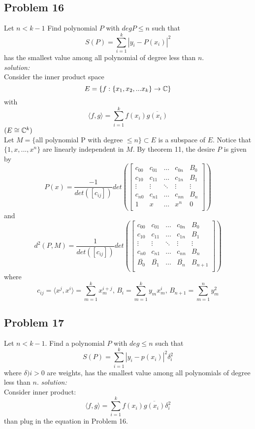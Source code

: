 \documentclass{article}
\begin{document}
\subsection*{Problem 16}
Let $n<k-1$ Find polynomial $P$ with $deg P\leq n$ such that 
\[
S(P)=\sum_{i=1}^{k}|y_i-P(x_i)|^2
\]
has the smallest value among all polynomial of degree less than $n$.\\
\emph{solution:}\\
Consider the inner product space
\[
E = \{f:\{x_1,x_2,...x_k\}\rightarrow \Bbb{C}\}
\]
with 
\[
\langle f,g \rangle = \sum_{i=1}^{k}f(x_i)\overline{g(x_i)}
\]
$(E\cong \Bbb{C}^k)$\\
Let  $M = \{$all polynomial P with degree $\leq n \} \subset E$ is a subspace of $E$. Notice that $\{1,x,...,x^n\}$ are linearly independent in $M$.
By theorem 11, the desire $P$ is given by
\[
P(x)=\frac{-1}{det([c_{ij}])}det(
\begin{bmatrix}
c_{00} & c_{01} & \dots & c_{0n} & B_{0} \\
c_{10} & c_{11} & \dots & c_{1n} & B_{1} \\
\vdots & \vdots & \ddots & \vdots &\vdots \\
c_{n0} & c_{n1} & \dots & c_{nn} & B_{n} \\
1 & x & \dots & x^n & 0 \\
\end{bmatrix}
)
\]
and
\[
d^2(P,M)=\frac{1}{det([c_{ij}])}det(
\begin{bmatrix}
c_{00} & c_{01} & \dots & c_{0n} & B_{0} \\
c_{10} & c_{11} & \dots & c_{1n} & B_{1} \\
\vdots & \vdots & \ddots & \vdots &\vdots \\
c_{n0} & c_{n1} & \dots & c_{nn} & B_{n} \\
\overline{B_{0}} & \overline{B_{1}} & \dots & \overline{B_{n}} & B_{n+1} \\
\end{bmatrix}
)
\]
where 
\[
c_{ij}=\langle x^j,x^i \rangle=\sum_{m=1}^{k} x_m^{i+j} ,\, B_i=\sum_{m=1}^{k}y_mx_m^i ,\, B_{n+1}=\sum_{m=1}^{n}y_m^2
\]

\subsection*{Problem 17}
Let $n<k-1$. Find a polynomial $P$ with $deg\leq n$ such that
\[
S(P)=\sum_{i=1}^{k}|y_i-p(x_i)|^2\delta_i^2
\]
where $\delta)i>0$ are weights, has the smallest value among all polynomials of degree less than $n$.
\emph{solution:}\\
Consider inner product:
\[
\langle f,g \rangle=\sum_{i=1}^{k} f(x_i)\overline{g(x_i)}\delta_i^2
\]
than plug in the equation in Problem 16.
\end{document}
